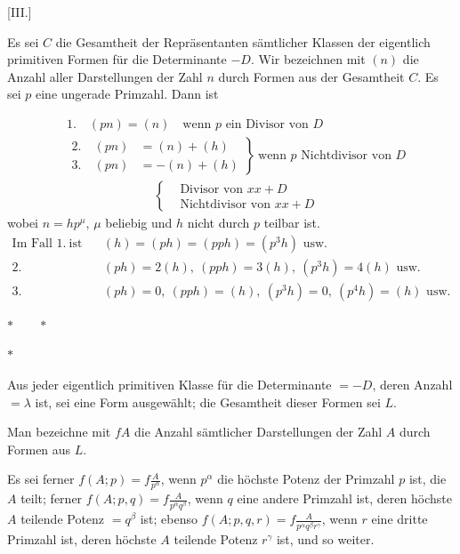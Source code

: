\clearpage
\par\bigskip{}\centerline{[III.]}\medskip
Es sei $C$ die Gesamtheit der Repräsentanten sämtlicher Klassen der eigentlich primitiven Formen für die Determinante $-D$. Wir bezeichnen mit $(n)$ die Anzahl aller Darstellungen der Zahl $n$ durch Formen aus der Gesamtheit $C$. Es sei $p$ eine ungerade Primzahl. Dann ist

\[
\begin{aligned}
&1.\quad(pn)=(n)\quad\text{wenn }p\text{ ein Divisor von }D\\
&\left.\begin{aligned}2.\quad(pn)&=(n)+(h)\\3.\quad(pn)&=-(n)+(h)\end{aligned}\right\}
\ \text{wenn }p\text{ Nichtdivisor von }D\\
&\hspace{7em}\left\{\begin{aligned}&\text{Divisor von }xx+D\\&\text{Nichtdivisor von }xx+D\end{aligned}\right.
\end{aligned}
\]
wobei $n=hp^\mu$, $\mu$ beliebig und $h$ nicht durch $p$ teilbar ist.
\[
\begin{aligned}
\text{Im Fall }1.\ \text{ist}\quad&(h)=(ph)=(pph)=(p^3h)\text{ usw.}\\
2.\quad&(ph)=2(h),\ (pph)=3(h),\ (p^3h)=4(h)\text{ usw.}\\
3.\quad&(ph)=0,\ (pph)=(h),\ (p^3h)=0,\ (p^4h)=(h)\text{ usw.}
\end{aligned}
\]
\begin{center}$\ast\qquad\ast$\par$\ast$\end{center}

Aus jeder eigentlich primitiven Klasse für die Determinante $=-D$, deren Anzahl $=\lambda$ ist, sei eine Form ausgewählt; die Gesamtheit dieser Formen sei $L$.

Man bezeichne mit $fA$ die Anzahl sämtlicher Darstellungen der Zahl $A$ durch Formen aus $L$.

Es sei ferner $f(A;p)=f\frac A{p^\alpha}$, wenn $p^\alpha$ die höchste Potenz der Primzahl $p$ ist, die $A$ teilt; ferner $f(A;p,q)=f\frac A{p^\alpha q^\beta}$, wenn $q$ eine andere Primzahl ist, deren höchste $A$ teilende Potenz $=q^\beta$ ist; ebenso $f(A;p,q,r)=f\frac A{p^\alpha q^\beta r^\gamma}$, wenn $r$ eine dritte Primzahl ist, deren höchste $A$ teilende Potenz $r^\gamma$ ist, und so weiter.

